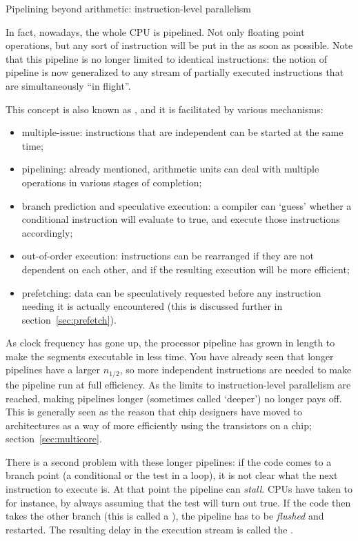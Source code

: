  {Pipelining beyond arithmetic: instruction-level parallelism}
\label{sec:pipelinecpu}

In fact, nowadays, the whole CPU is pipelined. Not only floating point
operations, but any sort of instruction will be put in the
 as soon
as possible. Note that this pipeline is no longer limited to identical
instructions: the notion of pipeline is now generalized to any stream
of partially executed instructions that are simultaneously ``in
flight''.

This concept is also known as , and it is facilitated by various mechanisms:
\begin{itemize}
\item multiple-issue: instructions that are independent can be started
  at the same time;
\item pipelining: already mentioned, arithmetic units can deal with
  multiple operations in various stages of completion;
\item branch prediction and speculative execution: a compiler can
  `guess' whether a conditional instruction will evaluate to true, and
  execute those instructions accordingly;
\item out-of-order execution: instructions can be rearranged if they
  are not dependent on each other, and if the resulting execution will
  be more efficient;
\item prefetching: data can be speculatively requested before any
  instruction needing it is actually encountered (this is discussed
  further in section~\ref{sec:prefetch}).
\end{itemize}

As clock frequency has gone up, the processor pipeline has grown in
length to make the segments executable in less time. You have already
seen that longer pipelines have a larger $n_{1/2}$, so more
independent instructions are needed to make the pipeline run at full
efficiency. As the limits to instruction-level parallelism are
reached, making pipelines longer (sometimes
called `deeper') no longer pays off. This is
generally seen as the reason that chip designers have moved to
 architectures as a way of more efficiently
using the transistors on a chip; section~\ref{sec:multicore}.

There is a second problem with these longer pipelines: if the code
comes to a branch point (a conditional or the test in a loop), it is
not clear what the next instruction to execute is. At that point the
pipeline can \emph{stall}. CPUs have taken to
 for instance, by always assuming
that the test will turn out true. If the code then takes the other
branch (this is called a ), the
pipeline has to be \emph{flushed} and
restarted. The resulting delay in the execution stream is called the
.


